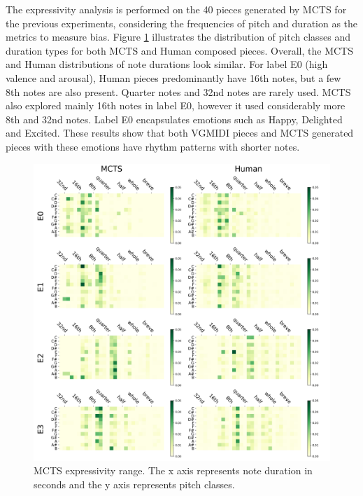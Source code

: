 The expressivity analysis is performed on the 40 pieces generated by MCTS for the previous experiments, considering the frequencies of pitch and duration as the metrics to measure bias. Figure \ref{fig:expressivity} illustrates the distribution of pitch classes and duration types for both MCTS and Human composed pieces. Overall, the MCTS and Human distributions of note durations look similar. For label E0 (high valence and arousal), Human pieces predominantly have 16th notes, but a few 8th notes are also present. Quarter notes and 32nd notes are rarely used. MCTS also explored mainly 16th notes in label E0, however it used considerably more 8th and 32nd notes. Label E0 encapsulates emotions such as Happy, Delighted and Excited. These results show that both VGMIDI pieces and MCTS generated pieces with these emotions have rhythm patterns with shorter notes.

\begin{figure}[h]
\centering
 \includegraphics[width=0.8\columnwidth]{imgs/ismir21/mcts_human.png}
   \caption{MCTS expressivity range. The x axis represents note duration in seconds and the y axis represents pitch classes. }
 \label{fig:expressivity}
\end{figure}

